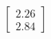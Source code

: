 \documentclass[preview]{standalone}
\begin{document}
\begin{align*}
\begin{bmatrix} 2.26 \\ 2.84 \end{bmatrix}
\end{align*}
\end{document}
